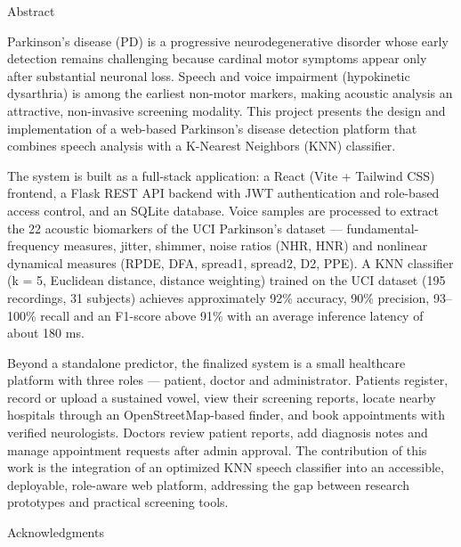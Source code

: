\documentclass[oneside,a4paper,12pt]{report}
\begin{document}
{\bfseries \fontsize{14}{12}\selectfont \centerline{Abstract}
\vspace*{2\baselineskip}}
\setlength{\parindent}{11mm}

Parkinson's disease (PD) is a progressive neurodegenerative disorder whose early
detection remains challenging because cardinal motor symptoms appear only after
substantial neuronal loss. Speech and voice impairment (hypokinetic dysarthria)
is among the earliest non-motor markers, making acoustic analysis an attractive,
non-invasive screening modality. This project presents the design and
implementation of a web-based Parkinson's disease detection platform that
combines speech analysis with a K-Nearest Neighbors (KNN) classifier.

The system is built as a full-stack application: a React (Vite + Tailwind CSS)
frontend, a Flask REST API backend with JWT authentication and role-based access
control, and an SQLite database. Voice samples are processed to extract the 22
acoustic biomarkers of the UCI Parkinson's dataset --- fundamental-frequency
measures, jitter, shimmer, noise ratios (NHR, HNR) and nonlinear dynamical
measures (RPDE, DFA, spread1, spread2, D2, PPE). A KNN classifier
(k = 5, Euclidean distance, distance weighting) trained on the UCI dataset (195
recordings, 31 subjects) achieves approximately 92\% accuracy, 90\% precision,
93--100\% recall and an F1-score above 91\% with an average inference latency of
about 180 ms.

Beyond a standalone predictor, the finalized system is a small healthcare
platform with three roles --- patient, doctor and administrator. Patients
register, record or upload a sustained vowel, view their screening reports,
locate nearby hospitals through an OpenStreetMap-based finder, and book
appointments with verified neurologists. Doctors review patient reports, add
diagnosis notes and manage appointment requests after admin approval. The
contribution of this work is the integration of an optimized KNN speech
classifier into an accessible, deployable, role-aware web platform, addressing
the gap between research prototypes and practical screening tools.
\setlength{\parindent}{0mm}

\newpage
{\bfseries \fontsize{14}{12}\selectfont \centerline{Acknowledgments}
\vspace*{2\baselineskip}}
\setlength{\parindent}{11mm}
\end{document}

